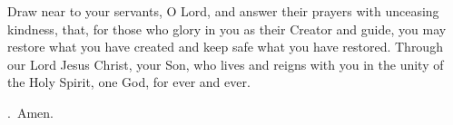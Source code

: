 \lettrine[lines=3]{D}{}raw near to your servants, O Lord,
and answer their prayers with unceasing kindness,
that, for those who glory in you as their Creator and guide,
you may restore what you have created
and keep safe what you have restored.
Through our Lord Jesus Christ, your Son,
who lives and reigns with you in the unity of the Holy Spirit,
one God, for ever and ever. \par \Rbar.~Amen.
